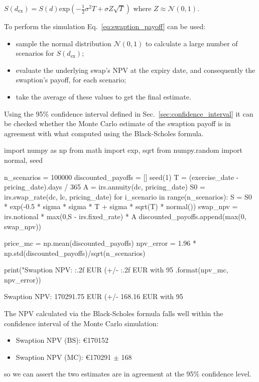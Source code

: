 \(S(d_{\mathrm{ex}}) = S(d)\mathrm{exp}(-\frac{1}{2}\sigma^{2}T+\sigma Z\sqrt{T})\)
\noindent
where $Z\approx\mathcal{N}(0,1)$. %

To perform the simulation Eq.~\ref{eq:swaption_payoff} can be used:

\begin{itemize}
\tightlist
\item sample the normal distribution \(\mathcal{N}(0, 1)\) to calculate a large number of scenarios for \(S(d_{\mathrm{ex}})\);
\item evaluate the underlying swap's NPV at the expiry date, and consequently the swaption's payoff, for each scenario;
\item take the average of these values to get the final estimate.
\end{itemize}

Using the 95\% confidence interval defined in Sec.~\ref{sec:confidence_interval} it can be checked whether the Monte Carlo estimate of the swaption payoff is in agreement with what computed using the Black-Scholes formula.

\begin{ipython}
import numpy as np
from math import exp, sqrt
from numpy.random import normal, seed

n_scenarios = 100000
discounted_payoffs = []
seed(1)
T = (exercise_date - pricing_date).days / 365
A = irs.annuity(dc, pricing_date)
S0 = irs.swap_rate(dc, lc, pricing_date)
for i_scenario in range(n_scenarios):
    S = S0 * exp(-0.5 * sigma * sigma * T +
        sigma * sqrt(T) * normal())
    swap_npv = irs.notional * max(0,S - irs.fixed_rate) * A
    discounted_payoffs.append(max(0, swap_npv))

price_mc = np.mean(discounted_payoffs)
npv_error = 1.96 * np.std(discounted_payoffs)/sqrt(n_scenarios)

print("Swaption NPV: {:.2f} EUR (+/- {:.2f} EUR with 95%
    .format(npv_mc, npv_error))
\end{ipython}
\begin{ioutput}
Swaption NPV: 170291.75 EUR (+/- 168.16 EUR with 95%
\end{ioutput}

The NPV calculated via the Black-Scholes formula falls well within the confidence interval of the Monte Carlo simulation:

\begin{itemize}
\tightlist
\item
  Swaption NPV (BS): \euro{170152}
\item
  Swaption NPV (MC): \euro{170291} $\pm$ 168
\end{itemize}
so we can assert the two estimates are in agreement at the 95\% confidence level.

